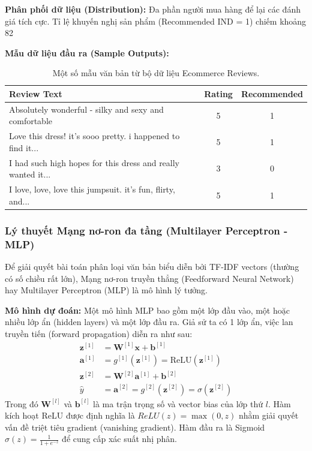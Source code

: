 \textbf{Phân phối dữ liệu (Distribution):}
Đa phần người mua hàng để lại các đánh giá tích cực. Tỉ lệ khuyến nghị sản phẩm (Recommended IND = 1) chiếm khoảng 82%

\textbf{Mẫu dữ liệu đầu ra (Sample Outputs):}
\begin{table}[h]
\centering
\begin{tabular}{|p{10cm}|c|c|}
\hline
Review Text & Rating & Recommended \\
\hline
Absolutely wonderful - silky and sexy and comfortable & 5 & 1 \\
Love this dress! it's sooo pretty. i happened to find it... & 5 & 1 \\
I had such high hopes for this dress and really wanted it... & 3 & 0 \\
I love, love, love this jumpsuit. it's fun, flirty, and... & 5 & 1 \\
\hline
\end{tabular}
\caption{Một số mẫu văn bản từ bộ dữ liệu Ecommerce Reviews.}
\end{table}

\subsubsection{Lý thuyết Mạng nơ-ron đa tầng (Multilayer Perceptron - MLP)}
Để giải quyết bài toán phân loại văn bản biểu diễn bởi TF-IDF vectors (thường có số chiều rất lớn), Mạng nơ-ron truyền thẳng (Feedforward Neural Network) hay Multilayer Perceptron (MLP) là mô hình lý tưởng.

\textbf{Mô hình dự đoán:}
Một mô hình MLP bao gồm một lớp đầu vào, một hoặc nhiều lớp ẩn (hidden layers) và một lớp đầu ra. Giả sử ta có 1 lớp ẩn, việc lan truyền tiến (forward propagation) diễn ra như sau:
\begin{align}
\mathbf{z}^{[1]} &= \mathbf{W}^{[1]}\mathbf{x} + \mathbf{b}^{[1]} \\
\mathbf{a}^{[1]} &= g^{[1]}(\mathbf{z}^{[1]}) = \text{ReLU}(\mathbf{z}^{[1]}) \\
\mathbf{z}^{[2]} &= \mathbf{W}^{[2]}\mathbf{a}^{[1]} + \mathbf{b}^{[2]} \\
\hat{y} &= \mathbf{a}^{[2]} = g^{[2]}(\mathbf{z}^{[2]}) = \sigma(\mathbf{z}^{[2]})
\end{align}
Trong đó $\mathbf{W}^{[l]}$ và $\mathbf{b}^{[l]}$ là ma trận trọng số và vector bias của lớp thứ $l$. Hàm kích hoạt ReLU được định nghĩa là $ReLU(z) = \max(0, z)$ nhằm giải quyết vấn đề triệt tiêu gradient (vanishing gradient). Hàm đầu ra là Sigmoid $\sigma(z) = \frac{1}{1 + e^{-z}}$ để cung cấp xác suất nhị phân.

